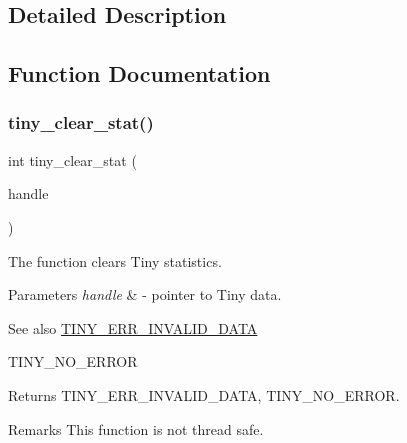 \subsection{Detailed Description}


\subsection{Function Documentation}
\mbox{\label{group__ADVANCED__API_gac75ee03ea3691b0a8bf842d764b342d9}} 
\subsubsection{\texorpdfstring{tiny\+\_\+clear\+\_\+stat()}{tiny\_clear\_stat()}}
{\footnotesize\ttfamily int tiny\+\_\+clear\+\_\+stat (\begin{DoxyParamCaption}\item[{\hyperlink{structSTinyData}{S\+Tiny\+Data} $\ast$}]{handle }\end{DoxyParamCaption})}

The function clears Tiny statistics. 
\begin{DoxyParams}{Parameters}
{\em handle} & -\/ pointer to Tiny data. \\
\hline
\end{DoxyParams}
\begin{DoxySeeAlso}{See also}
\hyperlink{group__ERROR__FLAGS_ga541a9e67a84e39595ad647d641c4df2e}{T\+I\+N\+Y\+\_\+\+E\+R\+R\+\_\+\+I\+N\+V\+A\+L\+I\+D\+\_\+\+D\+A\+TA} 

T\+I\+N\+Y\+\_\+\+N\+O\+\_\+\+E\+R\+R\+OR 
\end{DoxySeeAlso}
\begin{DoxyReturn}{Returns}
T\+I\+N\+Y\+\_\+\+E\+R\+R\+\_\+\+I\+N\+V\+A\+L\+I\+D\+\_\+\+D\+A\+TA, T\+I\+N\+Y\+\_\+\+N\+O\+\_\+\+E\+R\+R\+OR. 
\end{DoxyReturn}
\begin{DoxyRemark}{Remarks}
This function is not thread safe. 
\end{DoxyRemark}
\mbox{\label{group__ADVANCED__API_gac5cabf56a5b22e96036b9e5bff926f1d}} 
